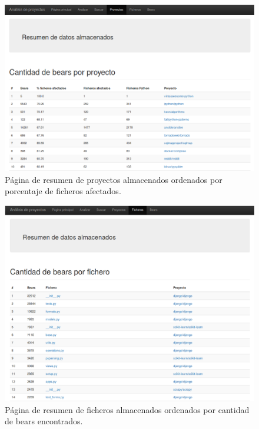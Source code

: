 \documentclass[a4paper, 12pt]{book}
\begin{document}
\begin{figure}[h]
  \centering
  \includegraphics[width=12cm, keepaspectratio]{img/resumenProyectos}
  \caption{Página de resumen de proyectos almacenados ordenados por porcentaje de ficheros afectados.}
  \label{fig:resumenProyectos}
\end{figure}

\begin{figure}[h]
  \centering
  \includegraphics[width=12cm, keepaspectratio]{img/resumenFicheros}
  \caption{Página de resumen de ficheros almacenados ordenados por cantidad de bears encontrados.}
  \label{fig:resumenFicheros}
\end{figure}
\end{document}
